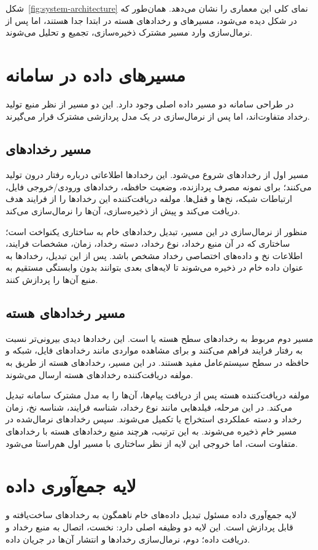 شکل~\ref{fig:system-architecture} نمای کلی این معماری را نشان می‌دهد. همان‌طور که در شکل دیده می‌شود، مسیرهای  و رخدادهای هسته در ابتدا جدا هستند، اما پس از نرمال‌سازی وارد مسیر مشترک ذخیره‌سازی، تجمیع و تحلیل می‌شوند.

\section{مسیرهای داده در سامانه}
در طراحی سامانه دو مسیر داده اصلی وجود دارد. این دو مسیر از نظر منبع تولید رخداد متفاوت‌اند، اما پس از نرمال‌سازی در یک مدل پردازشی مشترک قرار می‌گیرند.

\subsection{مسیر رخدادهای }
مسیر اول از رخدادهای  شروع می‌شود. این رخدادها اطلاعاتی درباره رفتار درون  تولید می‌کنند؛ برای نمونه مصرف پردازنده، وضعیت حافظه، رخدادهای ورودی/خروجی فایل، ارتباطات شبکه، نخ‌ها و قفل‌ها. مولفه دریافت‌کننده  این رخدادها را از فرایند هدف دریافت می‌کند و پیش از ذخیره‌سازی، آن‌ها را نرمال‌سازی می‌کند.

منظور از نرمال‌سازی در این مسیر، تبدیل رخدادهای خام  به ساختاری یکنواخت است؛ ساختاری که در آن منبع رخداد، نوع رخداد، دسته رخداد، زمان، مشخصات فرایند، اطلاعات نخ و داده‌های اختصاصی رخداد مشخص باشد. پس از این تبدیل، رخدادها به عنوان داده خام در  ذخیره می‌شوند تا لایه‌های بعدی بتوانند بدون وابستگی مستقیم به منبع  آن‌ها را پردازش کنند.

\subsection{مسیر رخدادهای هسته}
مسیر دوم مربوط به رخدادهای سطح هسته یا  است. این رخدادها دیدی بیرونی‌تر نسبت به رفتار فرایند فراهم می‌کنند و برای مشاهده مواردی مانند رخدادهای فایل، شبکه و حافظه در سطح سیستم‌عامل مفید هستند. در این مسیر، رخدادهای هسته از طریق  به مولفه دریافت‌کننده رخدادهای هسته ارسال می‌شوند.

مولفه دریافت‌کننده هسته پس از دریافت پیام‌ها، آن‌ها را به مدل مشترک سامانه تبدیل می‌کند. در این مرحله، فیلدهایی مانند نوع رخداد، شناسه فرایند، شناسه نخ، زمان رخداد و دسته عملکردی استخراج یا تکمیل می‌شوند. سپس رخدادهای نرمال‌شده در مسیر خام  ذخیره می‌شوند. به این ترتیب، هرچند منبع رخدادهای هسته با رخدادهای  متفاوت است، اما خروجی این لایه از نظر ساختاری با مسیر اول هم‌راستا می‌شود.

\section{لایه جمع‌آوری داده}
لایه جمع‌آوری داده مسئول تبدیل داده‌های خام ناهمگون به رخدادهای ساخت‌یافته و قابل پردازش است. این لایه دو وظیفه اصلی دارد: نخست، اتصال به منبع رخداد و دریافت داده؛ دوم، نرمال‌سازی رخدادها و انتشار آن‌ها در جریان داده.

